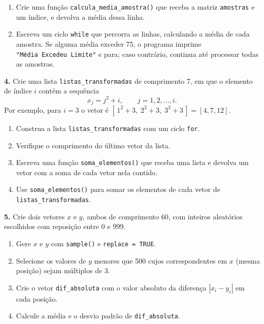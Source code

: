 \documentclass[
  portuguese,
  11pt,
  openany]{book}
\begin{document}
\begin{enumerate}
\def\labelenumi{(\alph{enumi})}
\item
  Crie uma função \texttt{calcula\_media\_amostra()} que receba a matriz \texttt{amostras} e um
  índice, e devolva a média dessa linha.
\item
  Escreva um ciclo \texttt{while} que percorra as linhas, calculando a média de cada
  amostra. Se alguma média exceder 75, o programa imprime \texttt{"Média\ Excedeu\ Limite"} e
  para; caso contrário, continua até processar todas as amostras.
\end{enumerate}

\textbf{4.} Crie uma lista \texttt{listas\_transformadas} de comprimento 7, em que o elemento de
índice \(i\) contém a sequência
\[x_j = j^2 + i, \qquad j = 1, 2, \ldots, i.\]
Por exemplo, para \(i = 3\) o vetor é \([\,1^2 + 3,\; 2^2 + 3,\; 3^2 + 3\,] = [4, 7, 12]\).

\begin{enumerate}
\def\labelenumi{(\alph{enumi})}
\item
  Construa a lista \texttt{listas\_transformadas} com um ciclo \texttt{for}.
\item
  Verifique o comprimento do último vetor da lista.
\item
  Escreva uma função \texttt{soma\_elementos()} que receba uma lista e devolva um vetor com
  a soma de cada vetor nela contido.
\item
  Use \texttt{soma\_elementos()} para somar os elementos de cada vetor de
  \texttt{listas\_transformadas}.
\end{enumerate}

\textbf{5.} Crie dois vetores \(x\) e \(y\), ambos de comprimento 60, com inteiros aleatórios
escolhidos com reposição entre 0 e 999.

\begin{enumerate}
\def\labelenumi{(\alph{enumi})}
\item
  Gere \(x\) e \(y\) com \texttt{sample()} e \texttt{replace\ =\ TRUE}.
\item
  Selecione os valores de \(y\) menores que 500 cujos correspondentes em \(x\) (mesma
  posição) sejam múltiplos de 3.
\item
  Crie o vetor \texttt{dif\_absoluta} com o valor absoluto da diferença \(|x_i - y_i|\) em
  cada posição.
\item
  Calcule a média e o desvio padrão de \texttt{dif\_absoluta}.
\end{enumerate}
\end{document}
